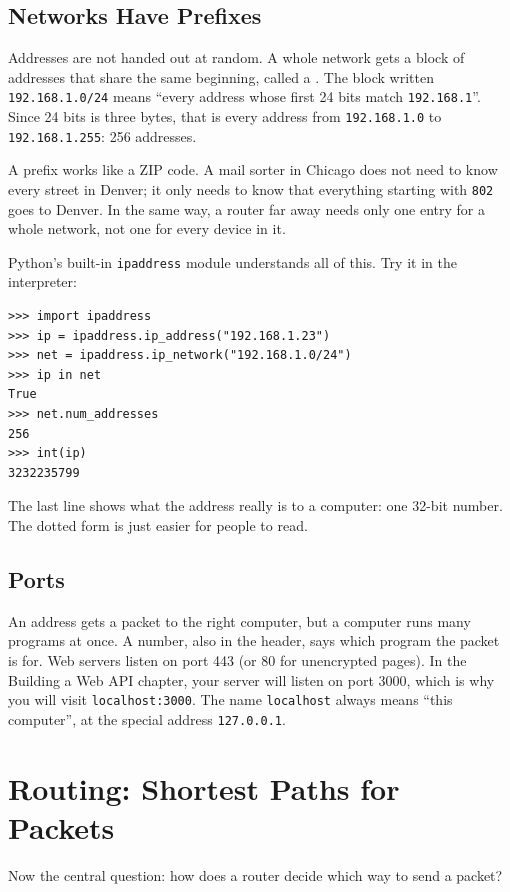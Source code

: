 \subsection{Networks Have Prefixes}
Addresses are not handed out at random. A whole network gets a block of addresses that share the same
beginning, called a . The block written \verb|192.168.1.0/24| means ``every address whose
first 24 bits match \verb|192.168.1|''. Since 24 bits is three bytes, that is every address from
\verb|192.168.1.0| to \verb|192.168.1.255|: 256 addresses.

A prefix works like a ZIP code. A mail sorter in Chicago does not need to know every street in Denver; it
only needs to know that everything starting with \verb|802| goes to Denver. In the same way, a router far
away needs only one entry for a whole network, not one for every device in it.

Python's built-in \verb|ipaddress| module understands all of this. Try it in the interpreter:

\begin{verbatim}
>>> import ipaddress
>>> ip = ipaddress.ip_address("192.168.1.23")
>>> net = ipaddress.ip_network("192.168.1.0/24")
>>> ip in net
True
>>> net.num_addresses
256
>>> int(ip)
3232235799
\end{verbatim}

The last line shows what the address really is to a computer: one 32-bit number. The dotted form is just
easier for people to read.

\subsection{Ports}
An address gets a packet to the right computer, but a computer runs many programs at once. A
 number, also in the header, says which program the packet is for. Web servers listen on
port 443 (or 80 for unencrypted pages). In the Building a Web API chapter, your server will listen on port 3000,
which is why you will visit \verb|localhost:3000|. The name \verb|localhost| always means ``this
computer'', at the special address \verb|127.0.0.1|.

\section{Routing: Shortest Paths for Packets}
Now the central question: how does a router decide which way to send a packet?

